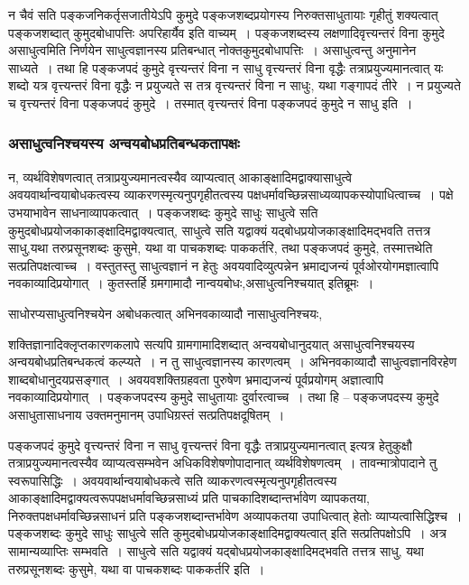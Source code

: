 				न चैवं सति पङ्कजनिकर्तृसजातीयेऽपि कुमुदे पङ्कजशब्दप्रयोगस्य निरुक्तसाधुतायाः गृहीतुं शक्यत्वात् पङ्कजशब्दात् कुमुदबोधापत्तिः अपरिहार्यैव इति वाच्यम्~। पङ्कजशब्दस्य लक्षणादिवृत्त्यन्तरं विना कुमुदे असाधुत्वमिति निर्णयेन साधुत्वज्ञानस्य प्रतिबन्धात् नोक्तकुमुदबोधापत्तिः~। असाधुत्वन्तु अनुमानेन साध्यते~। तथा हि पङ्कजपदं कुमुदे वृत्त्यन्तरं विना न साधु वृत्त्यन्तरं विना वृद्धैः तत्राप्रयुज्यमानत्वात् यः शब्दो यत्र वृत्त्यन्तरं विना वृद्धैः न प्रयुज्यते स तत्र वृत्त्यन्तरं विना न साधुः, यथा गङ्गापदं तीरे~। न प्रयुज्यते च वृत्त्यन्तरं विना पङ्कजपदं कुमुदे~। तस्मात् वृत्त्यन्तरं विना पङ्कजपदं कुमुदे न साधु इति~। 
			
			\subsubsection{असाधुत्वनिश्चयस्य अन्वयबोधप्रतिबन्धकतापक्षः}
			
				\begin{small}
			
					न, व्यर्थविशेषणत्वात् तत्राप्रयुज्यमानत्वस्यैव व्याप्यत्वात् आकाङ्क्षादिमद्वाक्यासाधुत्वे अवयवार्थान्वयाबोधकत्वस्य व्याकरणस्मृत्यनुपगृहीतत्वस्य पक्षधर्मावच्छिन्नसाध्यव्यापकस्योपाधित्वाच्च~। पक्षे उभयाभावेन साधनाव्यापकत्वात्~। पङ्कजशब्दः कुमुदे साधुः साधुत्वे सति कुमुदबोधप्रयोजकाकाङ्क्षादिमद्वाक्यत्वात्, साधुत्वे सति यद्वाक्यं यद्बोधप्रयोजकाङ्क्षादिमद्भवति तत्तत्र साधु,यथा तरुप्रसूनशब्दः कुसुमे, यथा वा पाचकशब्दः पाककर्तरि, तथा पङ्कजपदं कुमुदे, तस्मात्तथेति सत्प्रतिपक्षत्वाच्च~। वस्तुतस्तु साधुत्वज्ञानं न हेतुः अवयवादिव्युत्पन्नेन भ्रमाद्यजन्यं पूर्वओरयोगमज्ञात्वापि नवकाव्यादिप्रयोगात्~। कुतस्तर्हि ग्रमगामादौ नान्वयबोधः,असाधुत्वनिश्चयात् इतिब्रूमः~। 
	
					साधोरप्यसाधुत्वनिश्चयेन अबोधकत्वात् अभिनवकाव्यादौ नासाधुत्वनिश्चयः, 
				\end{small}
			
				शक्तिज्ञानादिक्लृप्तकारणकलापे सत्यपि ग्रामगामादिशब्दात् अन्वयबोधानुदयात् असाधुत्वनिश्चयस्य अन्वयबोधप्रतिबन्धकत्वं कल्प्यते~। न तु साधुत्वज्ञानस्य कारणत्वम्~। अभिनवकाव्यादौ साधुत्वज्ञानविरहेण शाब्दबोधानुदयप्रसङ्गात्~। अवयवशक्तिग्रहवता पुरुषेण भ्रमाद्यजन्यं पूर्वप्रयोगम् अज्ञात्वापि नवकाव्यादिप्रयोगात्~। पङ्कजपदस्य कुमुदे साधुतायाः दुर्वारत्वाच्च~। तथा हि – पङ्कजपदस्य कुमुदे असाधुतासाधनाय  उक्तमनुमानम् उपाधिग्रस्तं सत्प्रतिपक्षदूषितम्~।
	
				पङ्कजपदं कुमुदे वृत्त्यन्तरं विना न साधु वृत्त्यन्तरं विना वृद्धैः तत्राप्रयुज्यमानत्वात् इत्यत्र हेतुकुक्षौ तत्राप्रयुज्यमानत्वस्यैव व्याप्यत्वसम्भवेन अधिकविशेषणोपादानात् व्यर्थविशेषणत्वम्~। तावन्मात्रोपादाने तु स्वरूपासिद्धिः~। अवयवार्थान्वयाबोधकत्वे सति व्याकरणत्वस्मृत्यनुपगृहीतत्वस्य आकाङ्क्षादिमद्वाक्यत्वरूपपक्षधर्मावच्छिन्नसाध्यं प्रति पाचकादिशब्दान्तर्भावेण व्यापकतया, निरुक्तपक्षधर्मावच्छिन्नसाधनं प्रति पङ्कजशब्दान्तर्भावेण अव्यापकतया उपाधित्वात् हेतोः व्याप्यत्वासिद्धिश्च~। पङ्कजशब्दः कुमुदे साधुः साधुत्वे सति कुमुदबोधप्रयोजकाङ्क्षादिमद्वाक्यत्वात् इति सत्प्रतिपक्षोऽपि~। अत्र सामान्यव्याप्तिः सम्भवति~। साधुत्वे सति यद्वाक्यं यद्बोधप्रयोजकाङ्क्षादिमद्भवति तत्तत्र साधु, यथा तरुप्रसूनशब्दः कुसुमे, यथा वा पाचकशब्दः पाककर्तरि इति~।
			
